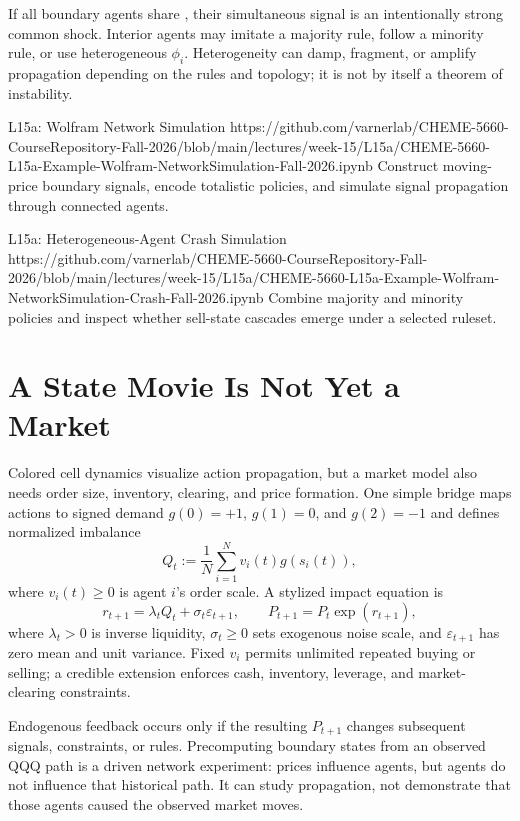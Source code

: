 \documentclass[11pt]{article}
\begin{document}
If all boundary agents share , their simultaneous signal is an intentionally strong common shock. Interior agents may imitate a majority rule, follow a minority rule, or use heterogeneous $\phi_i$. Heterogeneity can damp, fragment, or amplify propagation depending on the rules and topology; it is not by itself a theorem of instability.

\notebooklink
  {L15a: Wolfram Network Simulation}
  {https://github.com/varnerlab/CHEME-5660-CourseRepository-Fall-2026/blob/main/lectures/week-15/L15a/CHEME-5660-L15a-Example-Wolfram-NetworkSimulation-Fall-2026.ipynb}
  {Construct moving-price boundary signals, encode totalistic policies, and simulate signal propagation through connected agents.}

\notebooklink
  {L15a: Heterogeneous-Agent Crash Simulation}
  {https://github.com/varnerlab/CHEME-5660-CourseRepository-Fall-2026/blob/main/lectures/week-15/L15a/CHEME-5660-L15a-Example-Wolfram-NetworkSimulation-Crash-Fall-2026.ipynb}
  {Combine majority and minority policies and inspect whether sell-state cascades emerge under a selected ruleset.}

\section{A State Movie Is Not Yet a Market}

Colored cell dynamics visualize action propagation, but a market model also needs order size, inventory, clearing, and price formation. One simple bridge maps actions to signed demand $g(0)=+1$, $g(1)=0$, and $g(2)=-1$ and defines normalized imbalance
\begin{equation}
  \label{eq:imbalance}
  Q_t:=\frac{1}{N}\sum_{i=1}^{N}v_i(t)g(s_i(t)),
\end{equation}
where $v_i(t)\geq0$ is agent $i$'s order scale. A stylized impact equation is
\begin{equation}
  \label{eq:price-impact}
  r_{t+1}=\lambda_t Q_t+\sigma_t\varepsilon_{t+1},
  \qquad
  P_{t+1}=P_t\exp(r_{t+1}),
\end{equation}
where $\lambda_t>0$ is inverse liquidity, $\sigma_t\geq0$ sets exogenous noise scale, and $\varepsilon_{t+1}$ has zero mean and unit variance. Fixed $v_i$ permits unlimited repeated buying or selling; a credible extension enforces cash, inventory, leverage, and market-clearing constraints.

Endogenous feedback occurs only if the resulting $P_{t+1}$ changes subsequent signals, constraints, or rules. Precomputing boundary states from an observed QQQ path is a driven network experiment: prices influence agents, but agents do not influence that historical path. It can study propagation, not demonstrate that those agents caused the observed market moves.
\end{document}
